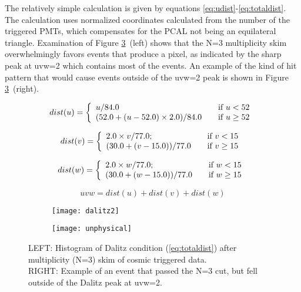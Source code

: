 The relatively simple calculation is given by equations \ref{eq:udist}-\ref{eq:totaldist}.  The calculation uses normalized coordinates calculated from the number of the triggered PMTs, which compensates for the PCAL not being an equilateral triangle.  Examination of Figure \ref{fig:dalitz}~(left) shows that the N=3 multiplicity skim overwhelmingly favors events that produce a pixel, as indicated by the sharp peak at uvw=2 which contains most of the events.  An example of the kind of hit pattern that would cause events outside of the uvw=2 peak is shown in Figure \ref{fig:dalitz}~(right).

\begin{equation}
    dist(u) = \left\{
        \begin{array}{l l}
            u/84.0                       & \quad \text{if $u < 52$}\\
            (52.0 + (u - 52.0)\times2.0)/84.0 & \quad \text{if $u \geq 52$}
        \end{array} \right.{}
         \label{eq:udist}
\end{equation}

\begin{equation}
    dist(v) = \left\{
        \begin{array}{l l}
            2.0 \times v/77.0;                       & \quad \text{if $v < 15$}\\
            (30.0 + (v - 15.0))/77.0                 & \quad \text{if $v \geq 15$}
        \end{array} \right.{}
         \label{eq:vdist}
\end{equation}


\begin{equation}
    dist(w) = \left\{
        \begin{array}{l l}
            2.0 \times w/77.0;                       & \quad \text{if $w < 15$}\\
            (30.0 + (w - 15.0))/77.0                 & \quad \text{if $w \geq 15$}
        \end{array} \right.{}
         \label{eq:wdist}
\end{equation}


\begin{equation} 
    uvw = dist(u) +  dist(v) + dist(w)
    \label{eq:totaldist}
\end{equation}

\begin{figure}[h]
    \centering
    \begin{subfigure}[h]{0.44\textwidth}
        \texttt{[image: dalitz2]}
        \label{fig:dalitz1}
    \end{subfigure}
    \begin{subfigure}[h]{0.55\textwidth}
        \texttt{[image: unphysical]}
        \label{fig:dalitz2}
    \end{subfigure}
\caption{LEFT: Histogram of Dalitz condition (\ref{eq:totaldist}) after multiplicity (N=3) skim of cosmic triggered data.\\ RIGHT: Example of an event that passed the N=3 cut, but fell outside of the Dalitz peak at uvw=2.}
\label{fig:dalitz}
\end{figure} 
\FloatBarrier
